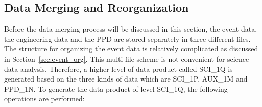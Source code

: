 \documentclass{raa}
\begin{document}
\subsection{Data Merging and Reorganization}\label{sec:data_merging}

Before the data merging process will be discussed in this section, the event data, the engineering data and the PPD are stored separately in three different files. The structure for organizing the event data is relatively complicated as discussed in Section~\ref{sec:event_org}. This multi-file scheme is not convenient for science data analysis. Therefore, a higher level of data product called SCI\_1Q is generated based on the three kinds of data which are SCI\_1P, AUX\_1M and PPD\_1N. To generate the data product of level SCI\_1Q, the following operations are performed:
\end{document}
